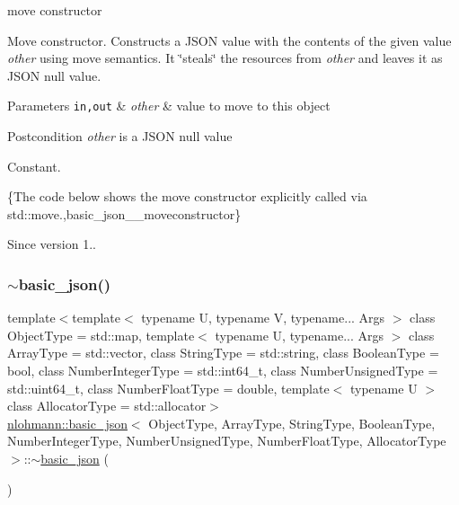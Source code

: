 move constructor 

Move constructor. Constructs a J\+S\+ON value with the contents of the given value {\itshape other} using move semantics. It \char`\"{}steals\char`\"{} the resources from {\itshape other} and leaves it as J\+S\+ON null value.


\begin{DoxyParams}[1]{Parameters}
\mbox{\tt in,out}  & {\em other} & value to move to this object\\
\hline
\end{DoxyParams}
\begin{DoxyPostcond}{Postcondition}
{\itshape other} is a J\+S\+ON null value
\end{DoxyPostcond}
Constant.

\{The code below shows the move constructor explicitly called via std\+::move.,basic\+\_\+json\+\_\+\+\_\+moveconstructor\}

\begin{DoxySince}{Since}
version 1.. 
\end{DoxySince}
\hypertarget{classnlohmann_1_1basic__json_a947b5b2a832e490858dbdddfe7085831}{}\label{classnlohmann_1_1basic__json_a947b5b2a832e490858dbdddfe7085831} 
\subsubsection{\texorpdfstring{$\sim$basic\+\_\+json()}{~basic\_json()}}
{\footnotesize\ttfamily template$<$template$<$ typename U, typename V, typename... Args $>$ class Object\+Type = std\+::map, template$<$ typename U, typename... Args $>$ class Array\+Type = std\+::vector, class String\+Type  = std\+::string, class Boolean\+Type  = bool, class Number\+Integer\+Type  = std\+::int64\+\_\+t, class Number\+Unsigned\+Type  = std\+::uint64\+\_\+t, class Number\+Float\+Type  = double, template$<$ typename U $>$ class Allocator\+Type = std\+::allocator$>$ \\
\hyperlink{classnlohmann_1_1basic__json}{nlohmann\+::basic\+\_\+json}$<$ Object\+Type, Array\+Type, String\+Type, Boolean\+Type, Number\+Integer\+Type, Number\+Unsigned\+Type, Number\+Float\+Type, Allocator\+Type $>$\+::$\sim$\hyperlink{classnlohmann_1_1basic__json}{basic\+\_\+json} (\begin{DoxyParamCaption}{ }\end{DoxyParamCaption})\hspace{0.3cm}{\ttfamily [inline]}}



